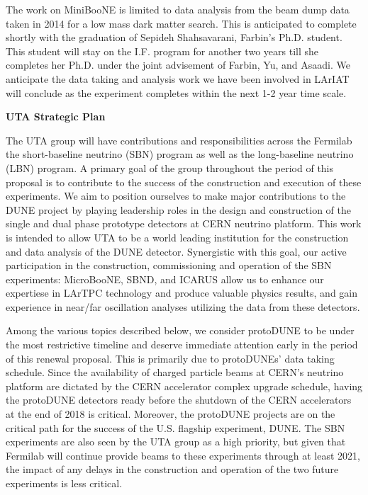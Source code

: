 The work on MiniBooNE is limited to data analysis from the beam dump data taken in 2014 for a low mass dark matter search. This is anticipated to complete shortly with the graduation of Sepideh Shahsavarani, Farbin’s Ph.D. student. This student will stay on the I.F. program for another two years till she completes her Ph.D. under the joint advisement of Farbin, Yu, and Asaadi. We anticipate the data taking and analysis work we have been involved in LArIAT will conclude as the experiment completes within the next 1-2 year time scale. 

\begin{center}
\textbf{ \Large{UTA Strategic Plan} }
\end{center} 

The UTA group will have contributions and responsibilities across the Fermilab the short-baseline neutrino (SBN) program as well as the long-baseline neutrino (LBN) program. A primary goal of the group throughout the period of this proposal is to contribute to the success of the construction and execution of these experiments. We aim to position ourselves to make major contributions to the DUNE project by playing leadership roles in the design and construction of the single and dual phase prototype detectors at CERN neutrino platform. This work is intended to allow UTA to be a world leading institution for the construction and data analysis of the DUNE detector. Synergistic with this goal, our active participation in the construction, commissioning and operation of the SBN experiments: MicroBooNE, SBND, and ICARUS allow us to enhance our expertiese in LArTPC technology and produce valuable physics results, and gain experience in near/far oscillation analyses utilizing the data from these detectors.

Among the various topics described below, we consider protoDUNE to be under the most restrictive timeline and deserve immediate  attention early in the period of this renewal proposal.  This is primarily due to protoDUNEs' data taking schedule. Since the availability of charged particle beams at CERN's neutrino platform are dictated by the CERN accelerator complex upgrade schedule, having the protoDUNE detectors ready before the shutdown of the CERN accelerators at the end of 2018 is critical. Moreover, the protoDUNE projects are on the critical path for the success of the U.S. flagship experiment, DUNE. The SBN experiments are also seen by the UTA group as a high priority, but given that Fermilab will continue provide beams to these experiments through at least 2021, the impact of any delays in the construction and operation of the two future experiments is less critical.

